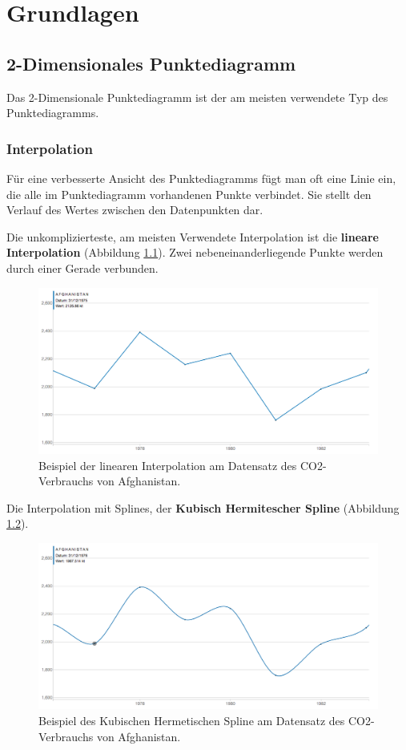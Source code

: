 \chapter{Grundlagen}

\section{2-Dimensionales Punktediagramm}
Das 2-Dimensionale Punktediagramm ist der am meisten verwendete Typ des Punktediagramms.

\subsection{Interpolation}
Für eine verbesserte Ansicht des Punktediagramms fügt man oft eine Linie ein, die alle im Punktediagramm vorhandenen Punkte verbindet. Sie stellt den Verlauf des Wertes zwischen den Datenpunkten dar.

Die unkomplizierteste, am meisten Verwendete Interpolation ist die \textbf{lineare Interpolation} (Abbildung \ref{fig:linear}). Zwei nebeneinanderliegende Punkte werden durch einer Gerade verbunden.

\begin{figure}[htbp]
	\centering
	\includegraphics[width=0.80\linewidth]{images/linear}
	\caption[Lineare Interpolation]{Beispiel der linearen Interpolation am Datensatz des CO2-Verbrauchs von Afghanistan.}
	\label{fig:linear}
\end{figure}

Die Interpolation mit Splines, der \textbf{Kubisch Hermitescher Spline} (Abbildung \ref{fig:cardinal}).

\begin{figure}[htbp]
	\centering
	\includegraphics[width=0.80\linewidth]{images/cardinal}
	\caption[Kubischer Hermitescher Spline]{Beispiel des Kubischen Hermetischen Spline am Datensatz des CO2-Verbrauchs von Afghanistan.}
	\label{fig:cardinal}
\end{figure}

